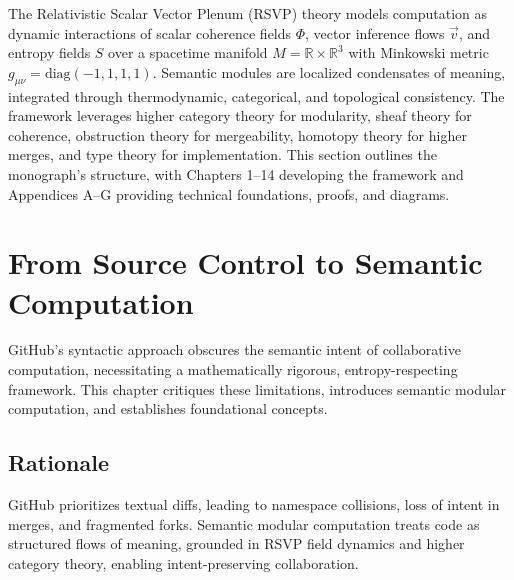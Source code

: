 \documentclass[12pt]{article}
\begin{document}
The Relativistic Scalar Vector Plenum (RSVP) theory models computation as dynamic interactions of scalar coherence fields $\Phi$, vector inference flows $\vec{v}$, and entropy fields $S$ over a spacetime manifold $M = \mathbb{R} \times \mathbb{R}^3$ with Minkowski metric $g_{\mu\nu} = \text{diag}(-1, 1, 1, 1)$. Semantic modules are localized condensates of meaning, integrated through thermodynamic, categorical, and topological consistency. The framework leverages higher category theory for modularity, sheaf theory for coherence, obstruction theory for mergeability, homotopy theory for higher merges, and type theory for implementation. This section outlines the monograph’s structure, with Chapters 1–14 developing the framework and Appendices A–G providing technical foundations, proofs, and diagrams.

\begin{center}
\end{center}

\section{From Source Control to Semantic Computation}
\label{sec:chapter1}

GitHub’s syntactic approach obscures the semantic intent of collaborative computation, necessitating a mathematically rigorous, entropy-respecting framework. This chapter critiques these limitations, introduces semantic modular computation, and establishes foundational concepts.

\subsection{Rationale}
GitHub prioritizes textual diffs, leading to namespace collisions, loss of intent in merges, and fragmented forks. Semantic modular computation treats code as structured flows of meaning, grounded in RSVP field dynamics and higher category theory, enabling intent-preserving collaboration.
\end{document}
